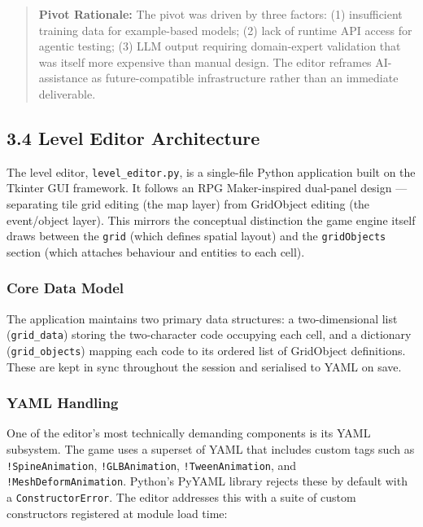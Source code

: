 \begin{quote}
\textbf{Pivot Rationale:} The pivot was driven by three factors: (1)
insufficient training data for example-based models; (2) lack of runtime
API access for agentic testing; (3) LLM output requiring domain-expert
validation that was itself more expensive than manual design. The editor
reframes AI-assistance as future-compatible infrastructure rather than
an immediate deliverable.
\end{quote}

\subsection{3.4 Level Editor
Architecture}\label{level-editor-architecture}

The level editor, \texttt{level\_editor.py}, is a single-file Python
application built on the Tkinter GUI framework. It follows an RPG
Maker-inspired dual-panel design --- separating tile grid editing (the
map layer) from GridObject editing (the event/object layer). This
mirrors the conceptual distinction the game engine itself draws between
the \texttt{grid} (which defines spatial layout) and the
\texttt{gridObjects} section (which attaches behaviour and entities to
each cell).

\subsubsection{Core Data Model}\label{core-data-model}

The application maintains two primary data structures: a two-dimensional
list (\texttt{grid\_data}) storing the two-character code occupying each
cell, and a dictionary (\texttt{grid\_objects}) mapping each code to its
ordered list of GridObject definitions. These are kept in sync
throughout the session and serialised to YAML on save.

\subsubsection{YAML Handling}\label{yaml-handling}

One of the editor's most technically demanding components is its YAML
subsystem. The game uses a superset of YAML that includes custom tags
such as \texttt{!SpineAnimation}, \texttt{!GLBAnimation},
\texttt{!TweenAnimation}, and \texttt{!MeshDeformAnimation}. Python's
PyYAML library rejects these by default with a
\texttt{ConstructorError}. The editor addresses this with a suite of
custom constructors registered at module load time:

